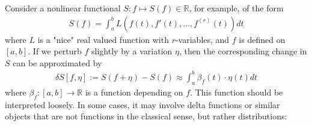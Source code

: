 \documentclass[12pt,b5paper,notitlepage]{article}
\theoremstyle{definition}
\theoremstyle{plain}
\newcommand{\Rbb}{\mathbb R}
\numberwithin{equation}{section}
\begin{document}
Consider a nonlinear functional $S:f\mapsto S(f)\in\Rbb$, for example, of the form
\begin{gather*}
S(f)=\int_a^b L(f(t),f'(t),\dots,f^{(r)}(t))dt
\end{gather*}
where $L$ is a "nice" real valued function with $r$-variables, and $f$ is defined on $[a,b]$. If we perturb $f$ slightly by a variation $\eta$, then the corresponding change in $S$ can be approximated by
\begin{align}\label{eq2}
\delta S[f,\eta]:=S(f+\eta)-S(f)\approx \int_a^b  \beta_f(t)\cdot \eta(t)dt
\end{align}
where $\beta_f:[a,b]\rightarrow\Rbb$ is a function depending on $f$. This function should be interpreted loosely. In some cases, it may involve delta functions or similar objects that are not functions in the classical sense, but rather distributions:
\end{document}
